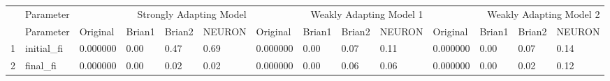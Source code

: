 \begin{tabular}{llllllllllllll}
 & Parameter & \multicolumn{4}{r}{Strongly Adapting Model} & \multicolumn{4}{r}{Weakly Adapting Model 1} & \multicolumn{4}{r}{Weakly Adapting Model 2} \\
 & Parameter & Original & Brian1 & Brian2 & NEURON & Original & Brian1 & Brian2 & NEURON & Original & Brian1 & Brian2 & NEURON \\
1 & initial_fi & 0.000000 & 0.00 & 0.47 & 0.69 & 0.000000 & 0.00 & 0.07 & 0.11 & 0.000000 & 0.00 & 0.07 & 0.14 \\
2 & final_fi & 0.000000 & 0.00 & 0.02 & 0.02 & 0.000000 & 0.00 & 0.06 & 0.06 & 0.000000 & 0.00 & 0.02 & 0.12 \\
\end{tabular}
